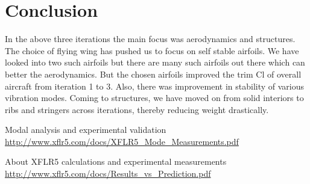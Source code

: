 \chapter{Conclusion}
In the above three iterations the main focus was aerodynamics and structures. The choice of flying wing has pushed us to focus on self stable airfoils. We have looked into two such airfoils but there are many such airfoils out there which can better the aerodynamics. But the chosen airfoils improved the trim Cl of overall aircraft from iteration 1 to 3. Also, there was improvement in stability of various vibration modes. Coming to structures, we have moved on from solid interiors to ribs and stringers across iterations, thereby reducing weight drastically.
\begin{thebibliography}{1}

   Modal analysis and experimental
validation {\url{http://www.xflr5.com/docs/XFLR5_Mode_Measurements.pdf}}

    About XFLR5 calculations and
experimental measurements {\url{http://www.xflr5.com/docs/Results_vs_Prediction.pdf}} 



\end{thebibliography}
